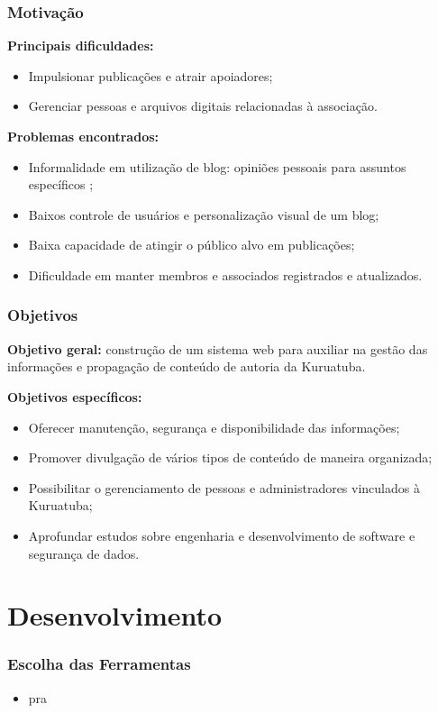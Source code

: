 \documentclass{beamer}
\begin{document}
\begin{frame}
    \frametitle{Motivação}
    \textbf{Principais dificuldades:}
    \begin{itemize}
     \item Impulsionar publicações e atrair apoiadores;
     \item Gerenciar pessoas e arquivos digitais relacionadas à associação.
    \end{itemize}

    
    \textbf{Problemas encontrados:}
    \begin{itemize}
        \item Informalidade em utilização de blog: opiniões pessoais para assuntos específicos \cite{centeno2017pampatur};
        \item Baixos controle de usuários e personalização visual de um blog; %
        \item Baixa capacidade de atingir o público alvo em publicações; %
        \item Dificuldade em manter membros e associados registrados e atualizados.
    \end{itemize}

\end{frame}


\begin{frame}
    \frametitle{Objetivos}
    \textbf{Objetivo geral:} construção de um sistema web para auxiliar na gestão das informações e propagação de conteúdo de autoria da Kuruatuba.
    
    \textbf{Objetivos específicos:}
    \begin{itemize}
        \item Oferecer manutenção, segurança e disponibilidade das informações;
        \item Promover divulgação de vários tipos de conteúdo de maneira organizada;
        \item Possibilitar o gerenciamento de pessoas e administradores vinculados à Kuruatuba;
        \item Aprofundar estudos sobre engenharia e desenvolvimento de software e segurança de dados.
    \end{itemize}
\end{frame}


\section{Desenvolvimento}
\begin{frame}
    \frametitle{Escolha das Ferramentas}
    \begin{itemize}
        \item pra 
    \end{itemize}
\end{frame}
\end{document}
